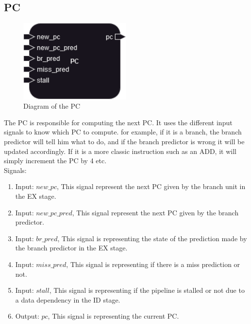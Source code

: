 \subsection{PC}

\begin{figure}[H]
\centering
\includegraphics[width=0.5\textwidth]{../diagrams/fetch/pc.png}
\caption{Diagram of the PC}
\label{fig:PC}
\end{figure}

The PC is responsible for computing the next PC. It uses the different input signals to know which PC to compute.
for example, if it is a branch, the branch predictor will tell him what to do, and if the branch predictor is wrong
it will be updated accordingly. If it is a more classic instruction such as an ADD, it will simply increment the PC by 4
etc. \\

Signals:
\begin{enumerate}[label={\textbullet}]
    \item Input: $new\_pc$, This signal represent the next PC given by the branch unit in the EX stage.
    \item Input: $new\_pc\_pred$, This signal represent the next PC given by the branch predictor.
    \item Input: $br\_pred$, This signal is representing the state of the prediction made by the branch predictor in the EX stage.
    \item Input: $miss\_pred$, This signal is representing if there is a miss prediction or not.
    \item Input: $stall$, This signal is representing if the pipeline is stalled or not due to a data dependency in the ID stage.
    \item Output: $pc$, This signal is representing the current PC.
\end{enumerate}